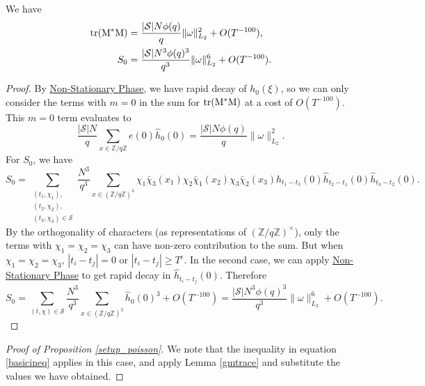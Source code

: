 \begin{lemma}
    We have \begin{align*}
        \rm{tr}(M^*M) &= \frac{|\mathcal{S}|N\phi(q)}{q}\|\omega\|_{L_2}^2 + O(T^{-100}),\\
        S_0 &= \frac{|\mathcal{S}|N^3\phi(q)^3}{q^3}\|\omega\|_{L_2}^6+O(T^{-100}).
    \end{align*}
\end{lemma}
\begin{proof}
    By \hyperref[nonstationary]{Non-Stationary Phase}, we have rapid decay of $h_0(\xi)$, so we can only consider the terms with $m=0$ in the sum for $\rm{tr}(M^*M)$ at a cost of $O(T^{-100})$.
    This $m=0$ term evaluates to \[
        \frac{|\mathcal{S}|N}{q}\sum_{x\in \mathbb{Z}/q\mathbb{Z}}e\left(0\right)\hat{h}_0\left(0\right)=\frac{|\mathcal{S}|N\phi(q)}{q}\|\omega\|_{L_2}^2.
    \]
    For $S_0$, we have\[
    S_0 = \sum_{\substack{(t_1,\chi_1),\\(t_2,\chi_2),\\(t_3,\chi_3)\in\mathcal{S}}}
    \frac{N^3}{q^3}\sum_{x\in (\mathbb{Z}/q\mathbb{Z})^3}\chi_1\bar{\chi}_3(x_1)\chi_2\bar{\chi}_1(x_2)\chi_3\bar{\chi}_2(x_3)  \hat{h}_{t_1-t_3}\left(0\right)\hat{h}_{t_2-t_1}\left(0\right)\hat{h}_{t_3-t_2}\left(0\right).
    \]
    By the orthogonality of characters (as representations of $(\mathbb{Z}/q\mathbb{Z})^{\times}$),
    only the terms with $\chi_1=\chi_2=\chi_3$ can have non-zero contribution to the sum. But when $\chi_1=\chi_2=\chi_3$, $|t_i-t_j|=0$ or $|t_i-t_j|\geq T^{\epsilon}$. In the second case, we can apply \hyperref[nonstationary]{Non-Stationary Phase} to get rapid decay in $\hat{h}_{t_i-t_j}({0})$. Therefore \[
        S_0 = \sum_{(t,\chi)\in\mathcal{S}}
        \frac{N^3}{q^3}\sum_{x\in (\mathbb{Z}/q\mathbb{Z})^3} \hat{h}_{0}\left(0\right)^3+O(T^{-100})=\frac{|\mathcal{S}|N^3\phi(q)^3}{q^3}\|\omega\|_{L_2}^6+O(T^{-100}).
    \]
\end{proof}

\begin{proof}[Proof of Proposition \ref{setup_poisson}]
    We note that the inequality in equation \ref{basicineq} applies in this case, and apply Lemma \ref{gmtrace} and substitute the values we have obtained.
\end{proof}